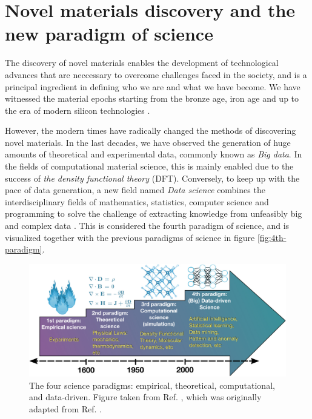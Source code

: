 \chapter{Novel materials discovery and the new paradigm of science}
%

The discovery of novel materials enables the development of technological advances that are neccessary to overcome challenges faced in the society, and is a principal ingredient in defining who we are and what we have become. We have witnessed the material epochs starting from the bronze age, iron age and up to the era of modern silicon technologies \cite{Jain2016, Magee2012}.

However, the modern times have radically changed the methods of discovering novel materials. In the last decades, we have observed the generation of huge amounts of theoretical and experimental data, commonly known as \textit{Big data}. In the fields of computational material science, this is mainly enabled due to the success of \textit{the density functional theory} (DFT). Conversely, to keep up with the pace of data generation, a new field named \textit{Data science} combines the interdisciplinary fields of mathematics, statistics, computer science and programming to solve the challenge of extracting knowledge from unfeasibly big and complex data \cite{Agrawal2016, Schleder2019}. This is considered the fourth paradigm of science, and is visualized together with the previous paradigms of science in figure \autoref{fig:4th-paradigm}.

\begin{figure}[ht!]
  \centering
  \includegraphics{theory/figures/4th-paradigm-hd.jpg}
  \caption{The four science paradigms: empirical, theoretical, computational, and data-driven. Figure taken from Ref.  \cite{Schleder2019}, which was originally adapted from Ref. \cite{Agrawal2016}.}
  \label{fig:4th-paradigm}
\end{figure}

